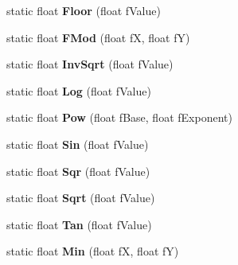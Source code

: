 \begin{DoxyCompactItemize}
\item 
static float {\bfseries Floor} (float f\+Value)\hypertarget{class_magnum_1_1_math_a681818c14168e1c0a9d92afe6ad70d93}{}\label{class_magnum_1_1_math_a681818c14168e1c0a9d92afe6ad70d93}

\item 
static float {\bfseries F\+Mod} (float fX, float fY)\hypertarget{class_magnum_1_1_math_a939ea710d204432d9a2d5e6f236215e8}{}\label{class_magnum_1_1_math_a939ea710d204432d9a2d5e6f236215e8}

\item 
static float {\bfseries Inv\+Sqrt} (float f\+Value)\hypertarget{class_magnum_1_1_math_aaa893539e31f74e92de99b9ecb531c0f}{}\label{class_magnum_1_1_math_aaa893539e31f74e92de99b9ecb531c0f}

\item 
static float {\bfseries Log} (float f\+Value)\hypertarget{class_magnum_1_1_math_a4329ae098e70d95df6e48db4fd6692c8}{}\label{class_magnum_1_1_math_a4329ae098e70d95df6e48db4fd6692c8}

\item 
static float {\bfseries Pow} (float f\+Base, float f\+Exponent)\hypertarget{class_magnum_1_1_math_a72f4b0b49bebb52476bc2814c652789b}{}\label{class_magnum_1_1_math_a72f4b0b49bebb52476bc2814c652789b}

\item 
static float {\bfseries Sin} (float f\+Value)\hypertarget{class_magnum_1_1_math_a33833dae05a0b8a61a293820c659314a}{}\label{class_magnum_1_1_math_a33833dae05a0b8a61a293820c659314a}

\item 
static float {\bfseries Sqr} (float f\+Value)\hypertarget{class_magnum_1_1_math_a27ba2d5470e5ec00e199c6062768bd71}{}\label{class_magnum_1_1_math_a27ba2d5470e5ec00e199c6062768bd71}

\item 
static float {\bfseries Sqrt} (float f\+Value)\hypertarget{class_magnum_1_1_math_a0a106f6b9724250ab5619bb4dd096f53}{}\label{class_magnum_1_1_math_a0a106f6b9724250ab5619bb4dd096f53}

\item 
static float {\bfseries Tan} (float f\+Value)\hypertarget{class_magnum_1_1_math_ad3f090125a5513b585ea07be3355418c}{}\label{class_magnum_1_1_math_ad3f090125a5513b585ea07be3355418c}

\item 
static float {\bfseries Min} (float fX, float fY)\hypertarget{class_magnum_1_1_math_a882ec1a69999f843e2b3e19009e6eb85}{}\label{class_magnum_1_1_math_a882ec1a69999f843e2b3e19009e6eb85}


\end{DoxyCompactItemize}
